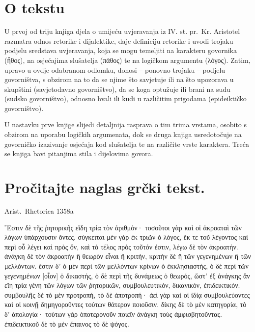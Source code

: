 


\section*{O tekstu}

U prvoj od triju knjiga djela o umijeću uvjeravanja iz IV. st. pr.~Kr. Aristotel razmatra odnos retorike i dijalektike, daje definiciju retorike i uvodi trojaku podjelu sredstava uvjeravanja, koja se mogu temeljiti na karakteru govornika \textgreek[variant=ancient]{(ἦθος),} na osjećajima slušatelja \textgreek[variant=ancient]{(πάθος)} te na logičkom argumentu \textgreek[variant=ancient]{(λόγος).} Zatim, upravo u ovdje odabranom odlomku, donosi – ponovno trojaku – podjelu govorništva, s obzirom na to da se njime što savjetuje ili na što upozorava u skupštini (savjetodavno govorništvo), da se koga optužuje ili brani na sudu (sudsko govorništvo), odnosno hvali ili kudi u različitim prigodama (epideiktičko govorništvo). 

U nastavku prve knjige slijedi detaljnija rasprava o tim trima vrstama, osobito s obzirom na uporabu logičkih argumenata, dok se druga knjiga usredotočuje na govorničko izazivanje osjećaja kod slušatelja te na različite vrste karaktera. Treća se knjiga bavi pitanjima stila i dijelovima govora.



\section*{Pročitajte naglas grčki tekst.}
Arist.\ Rhetorica 1358a

\medskip

{\large
\begin{greek}
\noindent ῎Εστιν δὲ τῆς ῥητορικῆς εἴδη τρία τὸν ἀριθμόν· τοσοῦτοι γὰρ καὶ οἱ ἀκροαταὶ τῶν λόγων ὑπάρχουσιν ὄντες. σύγκειται μὲν γὰρ ἐκ τριῶν ὁ λόγος, ἔκ τε τοῦ λέγοντος καὶ περὶ οὗ λέγει καὶ πρὸς ὅν, καὶ τὸ τέλος πρὸς τοῦτόν ἐστιν, λέγω δὲ τὸν ἀκροατήν. ἀνάγκη δὲ τὸν ἀκροατὴν ἢ θεωρὸν εἶναι ἢ κριτήν, κριτὴν δὲ ἢ τῶν γεγενημένων ἢ τῶν μελλόντων. ἔστιν δ' ὁ μὲν περὶ τῶν μελλόντων κρίνων ὁ ἐκκλησιαστής, ὁ δὲ περὶ τῶν γεγενημένων [οἷον] ὁ δικαστής, ὁ δὲ περὶ τῆς δυνάμεως ὁ θεωρός, ὥστ' ἐξ ἀνάγκης ἂν εἴη τρία γένη τῶν λόγων τῶν ῥητορικῶν, συμβουλευτικόν, δικανικόν, ἐπιδεικτικόν. συμβουλῆς δὲ τὸ μὲν προτροπή, τὸ δὲ ἀποτροπή· ἀεὶ γὰρ καὶ οἱ ἰδίᾳ συμβουλεύοντες καὶ οἱ κοινῇ δημηγοροῦντες τούτων θάτερον ποιοῦσιν. δίκης δὲ τὸ μὲν κατηγορία, τὸ δ' ἀπολογία· τούτων γὰρ ὁποτερονοῦν ποιεῖν ἀνάγκη τοὺς ἀμφισβητοῦντας. ἐπιδεικτικοῦ δὲ τὸ μὲν ἔπαινος τὸ δὲ ψόγος.

\end{greek}
}



